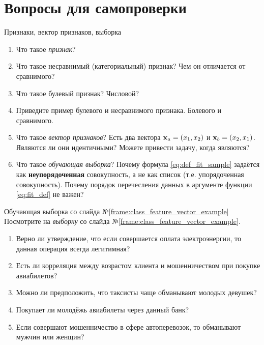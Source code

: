 \documentclass{beamer}
\newcommand{\term}{\textit}
\begin{document}
\section{Вопросы для самопроверки}

   \begin{frame}{Признаки, вектор признаков, выборка}
   \begin{enumerate}
   	\item Что такое \term{признак}?
   	\item Что такое несравнимый (категориальный) признак? Чем он отличается от сравнимого?
   	\item Что такое булевый признак? Числовой?
   	\item Приведите пример булевого и несравнимого признака. Болевого и сравнимого. 
   	\item Что такое \term{вектор признаков}? Есть два вектора $\bold x_a = (x_1, x_2)$ и $\bold x_b = (x_2, x_1)$.
   	Являются ли они идентичными? Можете привести задачу, когда являются?
   	\item Что такое \term{обучающая выборка}? Почему формула \eqref{eq:def_fit_sample} задаётся
   	как \textbf{неупорядоченная} совокупность, а не как список (т.е. упорядоченная совокупность).
   	Почему порядок перечесления данных в аргументе функции \eqref{eq:fit_def} не важен?
   \end{enumerate}
	\end{frame}

\begin{frame}{Обучающая выборка со слайда №\ref{frame:class_feature_vector_example}}
 	Посмотрите на \term{выборку} со слайда №\ref{frame:class_feature_vector_example}. 
 	\begin{enumerate}
 	\item Верно ли утверждение, что если совершается оплата электроэнергии, то данная операция всегда легитимная?
 	\item Есть ли корреляция между возрастом клиента и мошенничеством при покупке авиабилетов? 
 	\item Можно ли предположить, что таксисты чаще обманывают молодых девушек? 
 	\item Покупает ли молодёжь авиабилеты через данный банк? 
 	\item Если совершают мошенничество в сфере автоперевозок, то обманывают мужчин или женщин?
	\end{enumerate}
	\end{frame}
  
\end{document}
